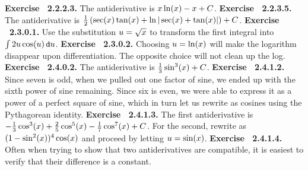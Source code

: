  {\noindent \protect \bf  Exercise ~2.2.2.3.} The antiderivative is $x\protect \qopname  \relax o{ln}(x)-x+C$. \protect \newline  \protect \newline  
 {\noindent \protect \bf  Exercise ~2.2.3.5.} The antiderivative is $\protect \frac  {1}{2}\left (\protect \qopname  \relax o{sec}(x)\protect \qopname  \relax o{tan}(x)+\protect \qopname  \relax o{ln}|\protect \qopname  \relax o{sec}(x)+\protect \qopname  \relax o{tan}(x)|\right )+C$. \protect \newline  \protect \newline  
 {\noindent \protect \bf  Exercise ~2.3.0.1.} Use the substitution $u=\protect \sqrt  {x}$ to transform the first integral into $\intop 2u\protect \qopname  \relax o{cos}(u) \mathop {}\protect \tmspace  -\thinmuskip {.1667em}\protect \mathtt  {d}u$. \protect \newline  \protect \newline  
 {\noindent \protect \bf  Exercise ~2.3.0.2.} Choosing $u=\protect \qopname  \relax o{ln}(x)$ will make the logarithm disappear upon differentiation. The opposite choice will not clean up the log. \protect \newline  \protect \newline  
 {\noindent \protect \bf  Exercise ~2.4.0.2.} The antiderivative is $\protect \frac  {1}{3}\protect \qopname  \relax o{sin}^3(x)+C$. \protect \newline  \protect \newline  
 {\noindent \protect \bf  Exercise ~2.4.1.2.} Since seven is odd, when we pulled out one factor of sine, we ended up with the sixth power of sine remaining. Since six is even, we were able to express it as a power of a perfect square of sine, which in turn let us rewrite as cosines using the Pythagorean identity. \protect \newline  \protect \newline  
 {\noindent \protect \bf  Exercise ~2.4.1.3.} The first antiderivative is $-\protect \frac  {1}{3}\protect \qopname  \relax o{cos}^3(x)+\protect \frac  {2}{5}\protect \qopname  \relax o{cos}^5(x)-\protect \frac  {1}{7}\protect \qopname  \relax o{cos}^7(x)+C$. For the second, rewrite as $(1-\protect \qopname  \relax o{sin}^2(x))^4\protect \qopname  \relax o{cos}(x)$ and proceed by letting $u=\protect \qopname  \relax o{sin}(x)$. \protect \newline  \protect \newline  
 {\noindent \protect \bf  Exercise ~2.4.1.4.} Often when trying to show that two antiderivatives are compatible, it is easiest to verify that their difference is a constant.  \protect \newline  \protect \newline  

